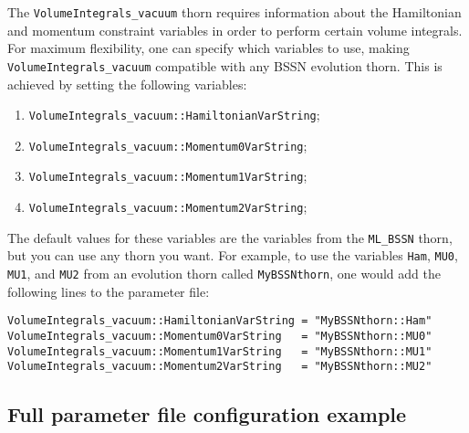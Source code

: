 The \texttt{VolumeIntegrals\_vacuum} thorn requires information about the
Hamiltonian and momentum constraint variables in order to perform certain
volume integrals. For maximum flexibility, one can specify which variables
to use, making \texttt{VolumeIntegrals\_vacuum} compatible with any BSSN
evolution thorn. This is achieved by setting the following variables:
\begin{enumerate}
  \setlength{\itemsep}{0.0pt}
  \setlength{\parskip}{0.0pt}
  \setlength{\parsep}{ 0.0pt}
  \item \texttt{VolumeIntegrals\_vacuum::HamiltonianVarString};
  \item \texttt{VolumeIntegrals\_vacuum::Momentum0VarString};
  \item \texttt{VolumeIntegrals\_vacuum::Momentum1VarString};
  \item \texttt{VolumeIntegrals\_vacuum::Momentum2VarString};
\end{enumerate}
The default values for these variables are the variables from the
\texttt{ML\_BSSN} thorn, but you can use any thorn you want. For example,
to use the variables \texttt{Ham}, \texttt{MU0}, \texttt{MU1}, and \texttt{MU2} from
an evolution thorn called \texttt{MyBSSNthorn}, one would add the following
lines to the parameter file:
\begin{verbatim}
VolumeIntegrals_vacuum::HamiltonianVarString = "MyBSSNthorn::Ham"
VolumeIntegrals_vacuum::Momentum0VarString   = "MyBSSNthorn::MU0"
VolumeIntegrals_vacuum::Momentum1VarString   = "MyBSSNthorn::MU1"
VolumeIntegrals_vacuum::Momentum2VarString   = "MyBSSNthorn::MU2"
\end{verbatim}

\subsection{Full parameter file configuration example}
\label{sec:full_parfileexample}


